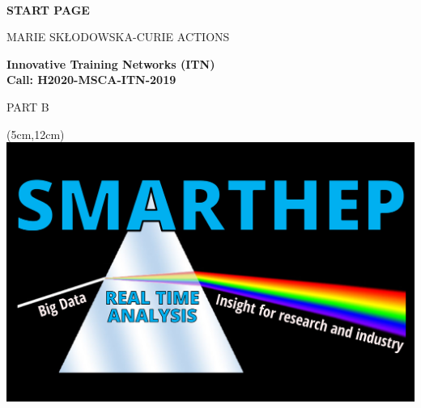 \documentclass[11pt,a4paper]{article}
\def\acronym{SMARTHEP\xspace}
\begin{document}
\begin{center}

\mbox{ }\\[1ex
\vspace{1cm}]

{\LARGE\bf START PAGE}

\vspace{2.5cm}


{\LARGE MARIE SK\L ODOWSKA-CURIE ACTIONS}\\[2ex]

\vspace{2cm}

{\LARGE\bf Innovative Training Networks (ITN)\\
Call: H2020-MSCA-ITN-2019}\\[2ex]

\vspace{1.0cm}

{\LARGE PART B}

\begin{center}
\begin{textblock*}{12cm}(5cm,12cm)
	\centering 
	\includegraphics[width=\textwidth]{figs/SMARTHEP_Logo}
\end{textblock*}    
\end{center}

\vspace{9.0cm}



\end{center}
\end{document}
